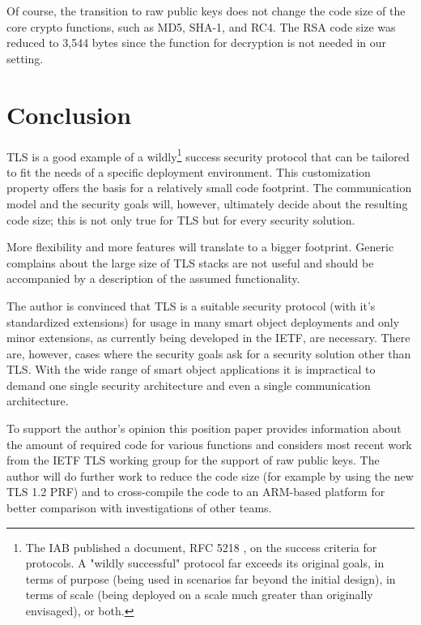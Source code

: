 \documentclass[a4paper, 10pt]{IEEEtran}
\begin{document}
Of course, the transition to raw public keys does not change the code size of the core crypto functions, such as MD5, SHA-1, and RC4. The RSA code size was reduced to 3,544 bytes since the function for decryption is not needed in our setting. 

\section{Conclusion}
TLS is a good example of a wildly\footnote{The IAB published a document, RFC 5218 \cite{rfc5218}, on the success criteria for protocols.  A "wildly successful" protocol far exceeds its original goals, in terms of purpose (being used in scenarios far beyond the initial design), in terms of scale (being deployed on a scale much greater than originally envisaged), or both.} success security protocol that can be tailored to fit the needs of a specific deployment environment. This customization property offers the basis for a relatively small code footprint. The communication model and the security goals will, however, ultimately decide about the resulting code size; this is not only true for TLS but for every security solution. 

More flexibility and more features will translate to a bigger footprint. Generic complains about the large size of TLS stacks are not useful and should be accompanied by a description of the assumed functionality.  

The author is convinced that TLS is a suitable security protocol (with it's standardized extensions) for usage in many smart object deployments and only minor extensions, as currently being developed in the IETF, are necessary. There are, however, cases where the security goals ask for a security solution other than TLS. With the wide range of smart object applications it is impractical to demand one single security architecture and even a single communication architecture. 

To support the author's opinion this position paper provides information about the amount of required code for various functions and considers most recent work from the IETF TLS working group for the support of raw public keys. The author will do further work to reduce the code size (for example by using the new TLS 1.2 PRF) and to cross-compile the code to an ARM-based platform for better comparison with investigations of other teams.


% 

\end{document}
